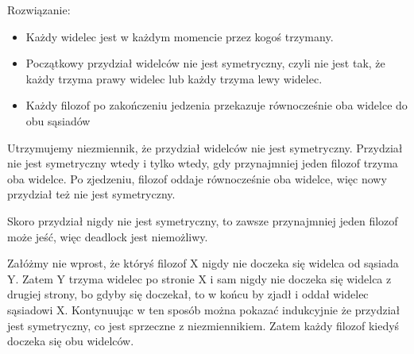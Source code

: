 Rozwiązanie:
\begin{itemize}
	\item Każdy widelec jest w każdym momencie przez kogoś trzymany.
	\item Początkowy przydział widelców nie jest symetryczny, czyli nie jest tak, że każdy trzyma prawy widelec lub każdy trzyma lewy widelec.
	\item Każdy filozof po zakończeniu jedzenia przekazuje równocześnie oba widelce do obu sąsiadów
\end{itemize}

Utrzymujemy niezmiennik, że przydział widelców nie jest symetryczny. Przydział nie jest symetryczny wtedy i tylko wtedy, gdy przynajmniej jeden filozof trzyma oba widelce. Po zjedzeniu, filozof oddaje równocześnie oba widelce, więc nowy przydział też nie jest symetryczny.

Skoro przydział nigdy nie jest symetryczny, to zawsze przynajmniej jeden filozof może jeść, więc deadlock jest niemożliwy.

Załóżmy nie wprost, że któryś filozof X nigdy nie doczeka się widelca od sąsiada Y. Zatem Y trzyma widelec po stronie X i sam nigdy nie doczeka się widelca z drugiej strony, bo gdyby się doczekał, to w końcu by zjadł i oddał widelec sąsiadowi X. Kontynuując w ten sposób można pokazać indukcyjnie że przydział jest symetryczny, co jest sprzeczne z niezmiennikiem. Zatem każdy filozof kiedyś doczeka się obu widelców.